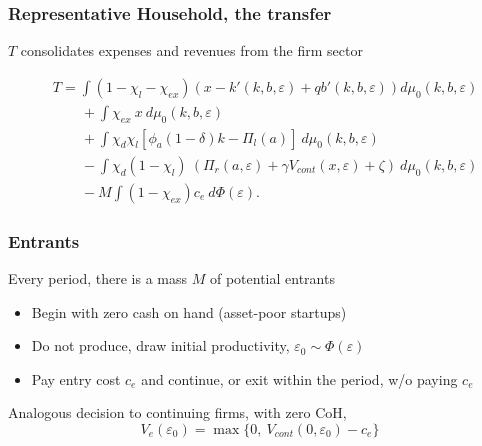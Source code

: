 \documentclass[aspectratio=169,xcolor=table]{beamer}
\begin{document}
\begin{frame}[label=HH_T] \frametitle{Representative Household, the transfer \hfill \hyperlink{Lpayoff}{}}

$T$ consolidates expenses and revenues from the firm sector \vspace{-5mm} 

\begin{equation*} \label{eq:T}
    \begin{split}
        & T = \int (1 - \chi_l - \chi_{ex}) \left( x - k'(k,b,\varepsilon) + qb'(k,b,\varepsilon) \right) d \mu_0(k,b,\varepsilon) \\
        & \qquad + \int \chi_{ex} \ x \ d \mu_0(k,b,\varepsilon) \\
        & \qquad + \int \chi_d \chi_{l} [ \phi_a (1-\delta) k - \Pi_{l}(a)  ] \ d \mu_0(k,b,\varepsilon)  \\
        & \qquad  - \int \chi_d (1-\chi_{l}) \ (\Pi_r(a,\varepsilon) +  \gamma V_{cont} (x, \varepsilon) + \zeta) \ d \mu_0(k,b,\varepsilon) \\
        & \qquad - M \int (1-\chi_{ex}) c_e \ d \Phi(\varepsilon) .
    \end{split}
\end{equation*}

\end{frame}




\begin{frame}[label=Entrants] \frametitle{Entrants \hfill \hyperlink{Firmvalues}{} \hyperlink{distplot}{}}

Every period, there is a mass $M$ of potential entrants
\begin{itemize} \small
    \item Begin with zero cash on hand (asset-poor startups)  
    \item Do not produce, draw initial productivity, $\varepsilon_0 \sim \Phi(\varepsilon)$  
    \item Pay entry cost $c_e$ and continue, or exit within the period, w/o paying $c_e$
\end{itemize} \normalsize \vspace{5mm}

Analogous decision to continuing firms, with zero CoH,
\begin{equation*} \label{eq:entrant decision}
V_e(\varepsilon_0) = \max \{0, \ V_{cont}(0,\varepsilon_0) - c_e \}
\end{equation*}


\end{frame}
\end{document}
